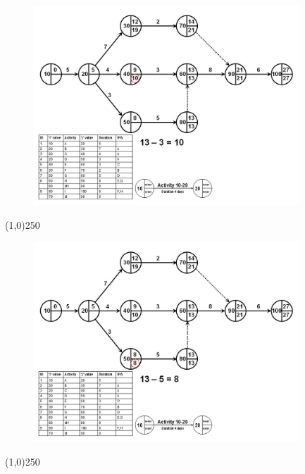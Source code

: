 \begin{frame}
\begin{figure}
	\centering
		\includegraphics[width = 10.0cm]{oldnotes/Slide117.jpg}
\end{figure}
\end{frame}
\begin{center}\line(1,0){250}\end{center}


\begin{frame}
\begin{figure}
	\centering
		\includegraphics[width = 10.0cm]{oldnotes/Slide118.jpg}
\end{figure}
\end{frame}
\begin{center}\line(1,0){250}\end{center}



